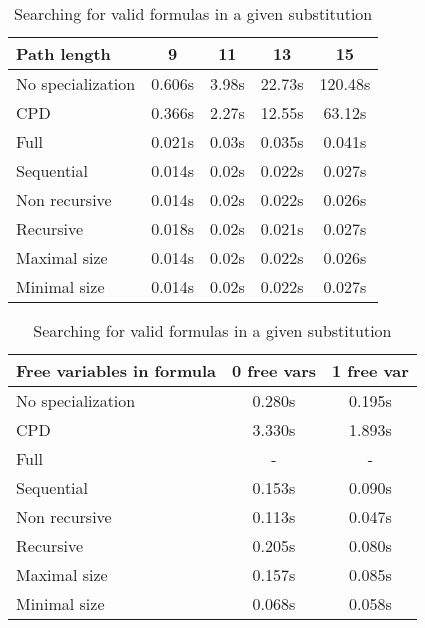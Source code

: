 \documentclass[submission,copyright,creativecommons]{eptcs}
\begin{document}
\begin{table}[!h]
\small
\begin{minipage}[t]{.4\textwidth}
\begin{tabular}{|p{2.5cm}|c|c|c|c|}
\hline
Path length & 9 & 11 & 13 & 15 \\ \hline
\hline
No specialization      & 0.606s & 3.98s & 22.73s & 120.48s \\
CPD          & 0.366s & 2.27s & 12.55s & 63.12s \\ \hline
Full         & 0.021s & 0.03s & 0.035s & 0.041s \\
Sequential   & 0.014s & 0.02s & 0.022s & 0.027s \\
Non recursive& 0.014s & 0.02s & 0.022s & 0.026s \\
Recursive    & 0.018s & 0.02s & 0.021s & 0.027s \\
Maximal size & 0.014s & 0.02s & 0.022s & 0.026s \\
Minimal size & 0.014s & 0.02s & 0.022s & 0.027s \\
\hline
\end{tabular}
\caption{Searching for paths in $K_{10}$.}
\label{tab:paths}
\end{minipage}
\qquad
\qquad
\qquad
\quad
\begin{minipage}[t]{.4\textwidth}
\begin{tabular}{|p{3.5cm}|c|c|}
\hline
Free variables in formula& 0 free vars & 1 free var  \\ \hline
\hline
No specialization       & 0.280s & 0.195s  \\
CPD           & 3.330s & 1.893s  \\
\hline
Full               & -       &  - \\
Sequential         & 0.153s  & 0.090s \\
Non recursive      & 0.113s & 0.047s \\
Recursive          & 0.205s & 0.080s \\
Maximal size       & 0.157s & 0.085s \\
Minimal size       & 0.068s & 0.058s \\
\hline
\end{tabular}
\caption{Searching for valid formulas in a given substitution}
\label{tab:logic}
\end{minipage}
\end{table}


\end{document}
